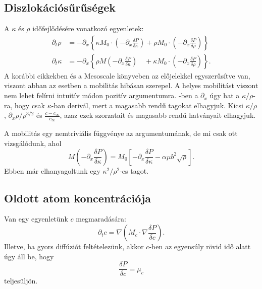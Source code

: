 \documentclass[10pt,a4paper]{scrartcl}
\begin{document}
\subsection{Diszlokációsűrűségek} A $\kappa$ és $\rho$ időfejlődésére vonatkozó egyenletek:
\begin{align} \label{eq:rho_eom}
  {\partial _t}\rho  & =  - {\partial _x}\left\{ {\kappa {M_0} \cdot \left( { - {\partial _x}\frac{{\delta P}}{{\delta \kappa }}} \right) + \rho {M_0} \cdot \left( { - {\partial _x}\frac{{\delta P}}{{\delta \rho }}} \right)} \right\} \\
  {\partial _t}\kappa  & =  - {\partial _x}\left\{ {\rho M\left( { - {\partial _x}\frac{{\delta P}}{{\delta \kappa }}} \right)\quad  + \kappa {M_0} \cdot \left( { - {\partial _x}\frac{{\delta P}}{{\delta \rho }}} \right)} \right\}. \label{eq:kappa_eom}
\end{align}
A korábbi cikkekben és a Mesoscale könyveben az előjelekkel egyszerűsítve van, viszont abban az esetben a mobilitás hibásan szerepel. A helyes mobilitást viszont nem lehet felírni intuitív módon pozitív argumentumra. -ben a $\partial_x$ úgy hat a $\kappa /\rho $-ra, hogy csak $\kappa$-ban derivál, mert a magasabb rendű tagokat elhagyjuk. Kicsi $\kappa /\rho $, ${\partial _x}\rho /{\rho ^{3/2}}$ és $\frac{{c - {c_\infty }}}{{{c_\infty }}}$, azaz ezek szorzatait és magasabb rendű hatványait elhagyjuk.

A mobilitás egy nemtriviális függvénye az argumentumának, de mi csak ott vizsgálódunk, ahol 
\begin{equation} \label{eq:nontriv_mobility}
M\left( { - {\partial _x}\frac{{\delta P}}{{\delta \kappa }}} \right) = {M_0}\left[ { - {\partial _x}\frac{{\delta P}}{{\delta \kappa }} - \alpha \mu {b^2}\sqrt \rho} \right].
\end{equation}
Ebben már elhanyagoltunk egy $ \kappa ^2 / \rho ^2 $-es tagot.

\subsection{Oldott atom koncentrációja} Van egy egyenletünk $c$ megmaradására:
\begin{equation} \label{eq:c_conti}
\partial_t c =  \nabla \left( {{M_c} \cdot \nabla \frac{{\delta P}}{{\delta c}}} \right).
\end{equation}
Illetve, ha gyors diffúziót feltételezünk, akkor $c$-ben az egyensúly rövid idő alatt úgy áll be, hogy
\[\frac{{\delta P}}{{\delta c}} = \mu_c \] teljesüljön.
\end{document}
